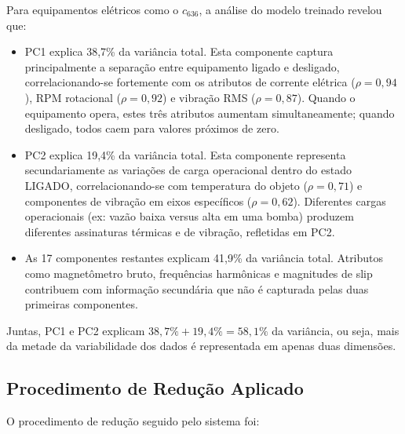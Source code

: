 Para equipamentos elétricos como o $c_{636}$, a análise do modelo treinado revelou que:

\begin{itemize}
    \item PC1 explica 38,7\% da variância total. Esta componente captura principalmente a separação entre equipamento ligado e desligado, correlacionando-se fortemente com os atributos de corrente elétrica ($\rho = 0,94$), RPM rotacional ($\rho = 0,92$) e vibração RMS ($\rho = 0,87$). Quando o equipamento opera, estes três atributos aumentam simultaneamente; quando desligado, todos caem para valores próximos de zero.

    \item PC2 explica 19,4\% da variância total. Esta componente representa secundariamente as variações de carga operacional dentro do estado LIGADO, correlacionando-se com temperatura do objeto ($\rho = 0,71$) e componentes de vibração em eixos específicos ($\rho = 0,62$). Diferentes cargas operacionais (ex: vazão baixa versus alta em uma bomba) produzem diferentes assinaturas térmicas e de vibração, refletidas em PC2.

    \item As 17 componentes restantes explicam 41,9\% da variância total. Atributos como magnetômetro bruto, frequências harmônicas e magnitudes de slip contribuem com informação secundária que não é capturada pelas duas primeiras componentes.
\end{itemize}

Juntas, PC1 e PC2 explicam $38,7\% + 19,4\% = 58,1\%$ da variância, ou seja, mais da metade da variabilidade dos dados é representada em apenas duas dimensões.

\subsection{Procedimento de Redução Aplicado}

O procedimento de redução seguido pelo sistema foi:

